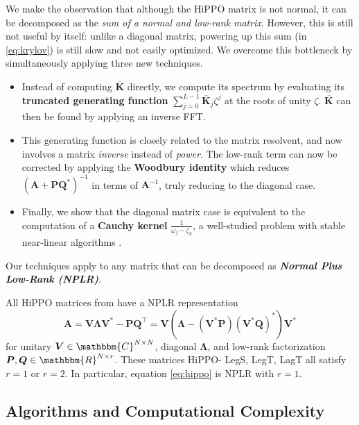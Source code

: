 We make the observation that although the HiPPO matrix is not normal, it can be decomposed as the \emph{sum of a normal and low-rank matrix}.
However, this is still not useful by itself:
unlike a diagonal matrix, powering up this sum (in \eqref{eq:krylov}) is still slow and not easily optimized.
We overcome this bottleneck by simultaneously applying three new techniques.
\begin{itemize}[leftmargin=*]%
  \item Instead of computing \( \bm{\overline{K}} \) directly,
    we compute its spectrum by evaluating its \textbf{truncated generating function} \( \sum_{j=0}^{L-1} \bm{\overline{K}}_j \zeta^j \) at the roots of unity \( \zeta \).
    \( \bm{\overline{K}} \) can then be found by applying an inverse FFT.
  \item This generating function is closely related to the matrix resolvent, and now involves a matrix \emph{inverse} instead of \emph{power}.
    The low-rank term can now be corrected by applying the \textbf{Woodbury identity} which reduces \( (\bm{A} + \bm{P}\bm{Q}^*)^{-1} \) in terms of \( \bm{A}^{-1} \), truly reducing to the diagonal case.
  \item Finally, we show that the diagonal matrix case is equivalent to the computation of a \textbf{Cauchy kernel} \( \frac{1}{\omega_j - \zeta_k} \), a well-studied problem with stable near-linear algorithms \citep{pan2015transformations,pan2017fast}.
\end{itemize}


Our techniques apply to any matrix that can be decomposed as \emph{\textbf{Normal Plus Low-Rank (NPLR)}}.
\begin{theorem}%
  \label{thm:hippo-nplr}
  All HiPPO matrices from \citep{gu2020hippo} have a NPLR representation
  \begin{equation}
    \label{eq:nplr}
    \bm{A} = \bm{V} \bm{\Lambda} \bm{V}^* - \bm{P} \bm{Q}^\top = \bm{V} \left( \bm{\Lambda} - \left(\bm{V}^* \bm{P}\right) (\bm{V}^*\bm{Q})^* \right) \bm{V}^*
  \end{equation}
  for unitary \( \bm{V} \in \mathbbm{C}^{N \times N} \), diagonal \( \bm{\Lambda} \), and low-rank factorization \( \bm{P}, \bm{Q} \in \mathbbm{R}^{N \times r} \).
  These matrices HiPPO- LegS, LegT, LagT all satisfy \( r=1 \) or \( r=2 \).
  In particular, equation \eqref{eq:hippo} is NPLR with \( r=1 \).
\end{theorem}

\subsection{\methodabbrv{} Algorithms and Computational Complexity}
\label{sec:s4-efficiency}


